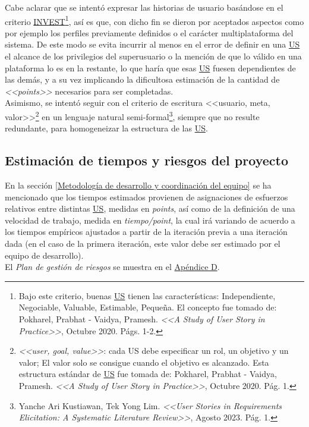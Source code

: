 \documentclass[a4paper, 12pt,twoside]{report}  %
\numberwithin{equation}{subsection} %
\begin{document}
Cabe aclarar que se intentó expresar las historias de usuario basándose en el criterio \hyperlink{INVEST}{INVEST}\footnote{Bajo este criterio, buenas \hyperlink{US}{US} tienen las características: Independiente, Negociable, Valuable, Estimable, Pequeña. El concepto fue tomado de: Pokharel, Prabhat - Vaidya, Pramesh. \textit{<<A Study of User Story in Practice>>}, Octubre 2020. Págs. 1-2.}, así es que, con dicho fin se dieron por aceptados aspectos como por ejemplo los perfiles previamente definidos o el carácter multiplataforma del sistema. De este modo se evita incurrir al menos en el error de definir en una \hyperlink{US}{US} el alcance de los privilegios del superusuario o la mención de que lo válido en una plataforma lo es en la restante, lo que haría que esas \hyperlink{US}{US} fuesen dependientes de las demás, y a su vez implicando la dificultosa estimación de la cantidad de \textit{<<points>>} necesarios para ser completadas.\\
\indent Asimismo, se intentó seguir con el criterio de escritura <<usuario, meta, valor>>\footnote{\textit{<<user, goal, value>>}: cada US debe especificar un rol, un objetivo y un valor; El valor solo se consigue cuando el objetivo es alcanzado. Esta estructura estándar de \hyperlink{US}{US} fue tomada de: Pokharel, Prabhat - Vaidya, Pramesh. \textit{<<A Study of User Story in Practice>>}, Octubre 2020. Pág. 1.} en un lenguaje natural semi-formal\footnote{Yanche Ari Kustiawan, Tek Yong Lim. \textit{<<User Stories in Requirements Elicitation: A Systematic Literature Review>>}, Agosto 2023. Pág. 1.}, siempre que no resulte redundante, para homogeneizar la estructura de las \hyperlink{US}{US}.


\subsection{Estimación de tiempos y riesgos del proyecto}
En la sección \ref{Metodología de desarrollo y coordinación del equipo} se ha mencionado que los tiempos estimados provienen de asignaciones de esfuerzos relativos entre distintas \hyperlink{US}{US}, medidas en \textit{points}, así como de la definición de una velocidad de trabajo, medida en \textit{tiempo/point}, la cual irá variando de acuerdo a los tiempos empíricos ajustados a partir de la iteración previa a una iteración dada (en el caso de la primera iteración, este valor debe ser estimado por el equipo de desarrollo).\\
\indent El \textit{Plan de gestión de riesgos} se muestra en el \hyperlink{apendice_d}{Apéndice D}.
\end{document}
